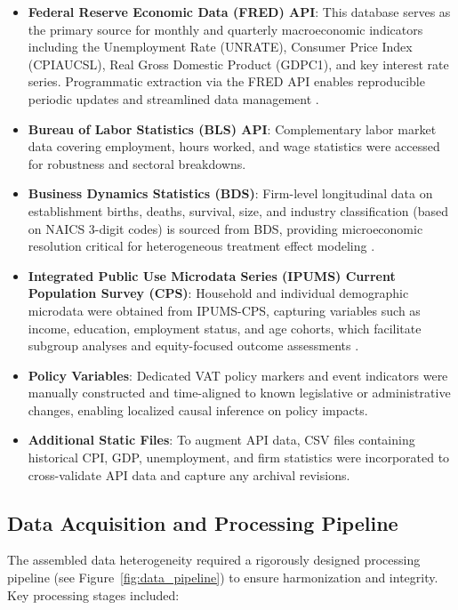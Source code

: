 \begin{itemize}
  \item \textbf{Federal Reserve Economic Data (FRED) API}: This database serves as the primary source for monthly and quarterly macroeconomic indicators including the Unemployment Rate (UNRATE), Consumer Price Index (CPIAUCSL), Real Gross Domestic Product (GDPC1), and key interest rate series. Programmatic extraction via the FRED API enables reproducible periodic updates and streamlined data management \citep{fred2025}.
  
  \item \textbf{Bureau of Labor Statistics (BLS) API}: Complementary labor market data covering employment, hours worked, and wage statistics were accessed for robustness and sectoral breakdowns.

  \item \textbf{Business Dynamics Statistics (BDS)}: Firm-level longitudinal data on establishment births, deaths, survival, size, and industry classification (based on NAICS 3-digit codes) is sourced from BDS, providing microeconomic resolution critical for heterogeneous treatment effect modeling \citep{bds2025}.

  \item \textbf{Integrated Public Use Microdata Series (IPUMS) Current Population Survey (CPS)}: Household and individual demographic microdata were obtained from IPUMS-CPS, capturing variables such as income, education, employment status, and age cohorts, which facilitate subgroup analyses and equity-focused outcome assessments \citep{ipums2025}.

  \item \textbf{Policy Variables}: Dedicated VAT policy markers and event indicators were manually constructed and time-aligned to known legislative or administrative changes, enabling localized causal inference on policy impacts.

  \item \textbf{Additional Static Files}: To augment API data, CSV files containing historical CPI, GDP, unemployment, and firm statistics were incorporated to cross-validate API data and capture any archival revisions.
\end{itemize}

\subsection{Data Acquisition and Processing Pipeline}

The assembled data heterogeneity required a rigorously designed processing pipeline (see Figure~\ref{fig:data_pipeline}) to ensure harmonization and integrity. Key processing stages included:

